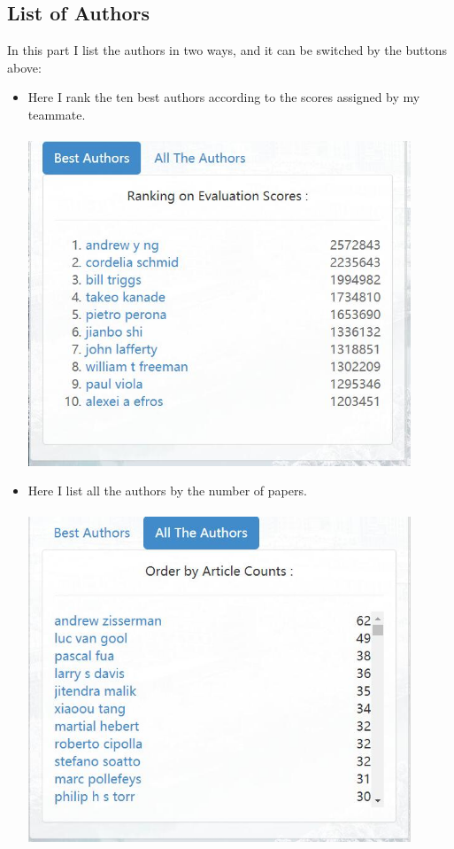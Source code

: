\documentclass{article}
\begin{document}
	\subsection{List of Authors}
	In this part I list the authors in two ways, and it can be switched by the buttons above:
	\begin{itemize}
		\item Here I rank the ten best authors according to the scores assigned by my teammate.\\\\\includegraphics[width=0.9\textwidth]{author1.jpg} \\
		\item Here I list all the authors by the number of papers.\\\\\includegraphics[width=0.9\textwidth]{author2.jpg}\\

\end{itemize}
\end{document}

